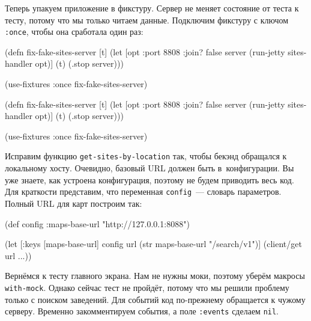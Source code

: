 Теперь упакуем приложение в фикстуру. Сервер не меняет состояние от теста к
тесту, потому что мы только читаем данные. Подключим фикстуру с ключом
\verb|:once|, чтобы она сработала один раз:

\ifnarrow

\begin{english}
  \begin{clojure}
(defn fix-fake-sites-server [t]
  (let [opt {:port 8808 :join? false}
        server (run-jetty
                 sites-handler opt)]
    (t)
    (.stop server)))

(use-fixtures :once
  fix-fake-sites-server)
  \end{clojure}
\end{english}

\else

\begin{english}
  \begin{clojure}
(defn fix-fake-sites-server [t]
  (let [opt {:port 8808 :join? false}
        server (run-jetty sites-handler opt)]
    (t)
    (.stop server)))

(use-fixtures :once fix-fake-sites-server)
  \end{clojure}
\end{english}

\fi


\mnoindent
Исправим функцию \verb|get-sites-by-location| так, чтобы бекэнд обращался к
локальному хосту. Очевидно, базовый URL должен быть в~конфигурации. Вы уже
знаете, как устроена конфигурация, поэтому не будем приводить весь код. Для
краткости представим, что переменная \verb|config|~--- словарь
параметров. Полный URL для карт построим так:

\begin{english}
  \begin{clojure}
(def config
  {:maps-base-url "http://127.0.0.1:8088"})

(let [{:keys [maps-base-url]} config
      url (str maps-base-url "/search/v1")]
  (client/get url {...}))
  \end{clojure}
\end{english}

Вернёмся к тесту главного экрана. Нам не нужны моки, поэтому уберём макросы
\verb|with-mock|. Однако сейчас тест не пройдёт, потому что мы решили проблему
только с поиском заведений. Для событий код по-прежнему обращается к чужому
серверу. Временно закомментируем события, а поле \verb|:events| сделаем
\verb|nil|.

